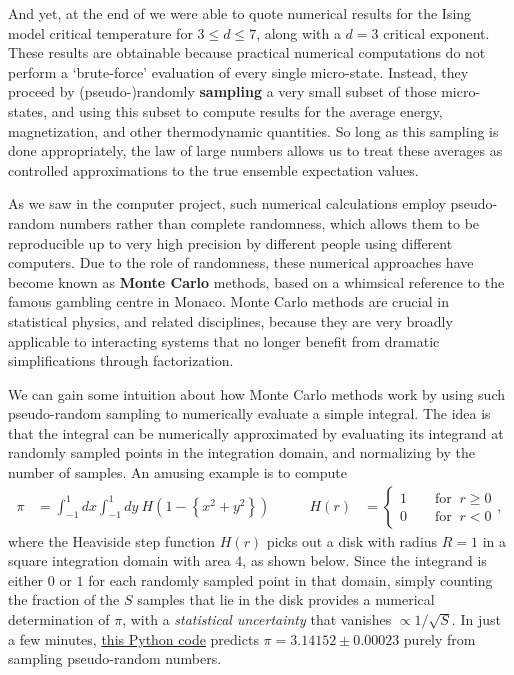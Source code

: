 And yet, at the end of  we were able to quote numerical results for the Ising model critical temperature for $3 \leq d \leq 7$, along with a $d = 3$ critical exponent.
These results are obtainable because practical numerical computations do not perform a `brute-force' evaluation of every single micro-state.
Instead, they proceed by (pseudo-)randomly \textbf{sampling} a very small subset of those micro-states, and using this subset to compute results for the average energy, magnetization, and other thermodynamic quantities.
So long as this sampling is done appropriately, the law of large numbers allows us to treat these averages as controlled approximations to the true ensemble expectation values.

As we saw in the computer project, such numerical calculations employ pseudo-random numbers rather than complete randomness, which allows them to be reproducible up to very high precision by different people using different computers.
Due to the role of randomness, these numerical approaches have become known as \textbf{Monte Carlo} methods, based on a whimsical reference to the famous gambling centre in Monaco.
Monte Carlo methods are crucial in statistical physics, and related disciplines, because they are very broadly applicable to interacting systems that no longer benefit from dramatic simplifications through factorization.

We can gain some intuition about how Monte Carlo methods work by using such pseudo-random sampling to numerically evaluate a simple integral.
The idea is that the integral can be numerically approximated by evaluating its integrand at randomly sampled points in the integration domain, and normalizing by the number of samples.
An amusing example is to compute
\begin{align*}
  \pi & = \int_{-1}^1 dx \int_{-1}^1 dy \ H\!\left(1 - \left\{x^2 + y^2\right\}\right) \qquad &
  H(r) & = \left\{\begin{array}{l}1 \qquad \mbox{for } \ r \geq 0 \\
                                  0 \qquad \mbox{for } \ r < 0\end{array}\right. ,
\end{align*}
where the Heaviside step function $H(r)$ picks out a disk with radius $R = 1$ in a square integration domain with area $4$, as shown below.
Since the integrand is either $0$ or $1$ for each randomly sampled point in that domain, simply counting the fraction of the $S$ samples that lie in the disk provides a numerical determination of $\pi$, with a \textit{statistical uncertainty} that vanishes $\propto 1 / \sqrt{S}$.
In just a few minutes, \href{https://github.com/daschaich/MATH327_2022/blob/master/lecture_notes/unit10_pi.py}{this Python code} predicts $\pi = 3.14152 \pm 0.00023$ purely from sampling pseudo-random numbers.

